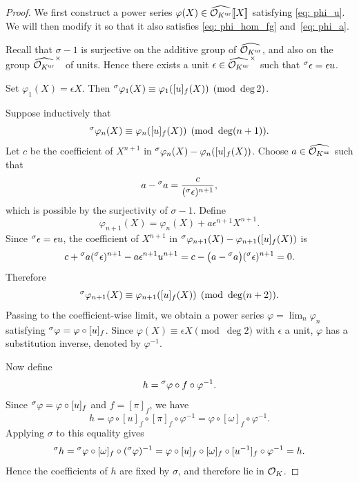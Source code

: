 \begin{proof}
    We first construct a power series
    $\varphi(X) \in \widehat{\mathcal{O}_{K^{\mathrm{ur}}}}[\![X]\!]$ satisfying
    \eqref{eq: phi_u}. We will then modify it so that it also satisfies
    \eqref{eq: phi_hom_fg} and~\eqref{eq: phi_a}.

    Recall that $\sigma-1$ is surjective on the additive group of
    $\widehat{\mathcal{O}_{K^{\mathrm{ur}}}}$, and also on the group
    $\widehat{\mathcal{O}_{K^{\mathrm{ur}}}}^\times$ of units. Hence there exists a unit
    $\epsilon \in \widehat{\mathcal{O}_{K^{\mathrm{ur}}}}^\times$ such that
    ${}^{\sigma}\epsilon=\epsilon u$.

    Set $\varphi_1(X)=\epsilon X$. Then
    ${}^{\sigma}\varphi_1(X) \equiv
    \varphi_1([u]_f(X)) \pmod{\deg 2}$.

    Suppose inductively that
    \[
        {}^{\sigma}\varphi_n(X)
        \equiv
        \varphi_n([u]_f(X))
        \pmod{\deg(n+1)}.
    \]
    Let $c$ be the coefficient of $X^{n+1}$ in
    ${}^{\sigma}\varphi_n(X)-\varphi_n([u]_f(X))$. Choose
    $a \in \widehat{\mathcal{O}_{K^{\mathrm{ur}}}}$ such that
    \[
        a-{}^{\sigma}a
        =
        \frac{c}{({}^{\sigma}\epsilon)^{n+1}},
    \]
    which is possible by the surjectivity of $\sigma-1$. Define
    \[
        \varphi_{n+1}(X)
        =
        \varphi_n(X)+a\epsilon^{n+1}X^{n+1}.
    \]
    Since ${}^{\sigma}\epsilon=\epsilon u$, the coefficient of
    $X^{n+1}$ in
    ${}^{\sigma}\varphi_{n+1}(X)-\varphi_{n+1}([u]_f(X))$
    is
    \[
        c+{}^{\sigma}a({}^{\sigma}\epsilon)^{n+1}
        -a\epsilon^{n+1}u^{n+1}
        =
        c-\bigl(a-{}^{\sigma}a\bigr)
        ({}^{\sigma}\epsilon)^{n+1}
        =
        0.
    \]
    Therefore
    \[
        {}^{\sigma}\varphi_{n+1}(X)
        \equiv
        \varphi_{n+1}([u]_f(X))
        \pmod{\deg(n+2)}.
    \]
    Passing to the coefficient-wise limit, we obtain a power series
    $\varphi=\lim_n \varphi_n$ satisfying
    ${}^{\sigma}\varphi=\varphi\circ [u]_f$. Since
    $\varphi(X)\equiv \epsilon X \pmod{\deg 2}$ with $\epsilon$ a unit,
    $\varphi$ has a substitution inverse, denoted by $\varphi^{-1}$.

    Now define
    \[
        h
        =
        {}^{\sigma}\varphi\circ f\circ \varphi^{-1}.
    \]
    Since ${}^{\sigma}\varphi=\varphi\circ [u]_f$ and
    $f=[\pi]_f$, we have
    \[
        h
        =
        \varphi\circ [u]_f\circ [\pi]_f\circ \varphi^{-1}
        =
        \varphi\circ [\omega]_f\circ \varphi^{-1}.
    \]
    Applying $\sigma$ to this equality gives
    \[
        {}^{\sigma}h
        =
        {}^{\sigma}\varphi\circ [\omega]_f
        \circ ({}^{\sigma}\varphi)^{-1}
        =
        \varphi\circ [u]_f\circ [\omega]_f\circ [u^{-1}]_f
        \circ \varphi^{-1}
        =
        h.
    \]
    Hence the coefficients of $h$ are fixed by $\sigma$, and therefore lie in
    $\mathcal{O}_K$.


\end{proof}
